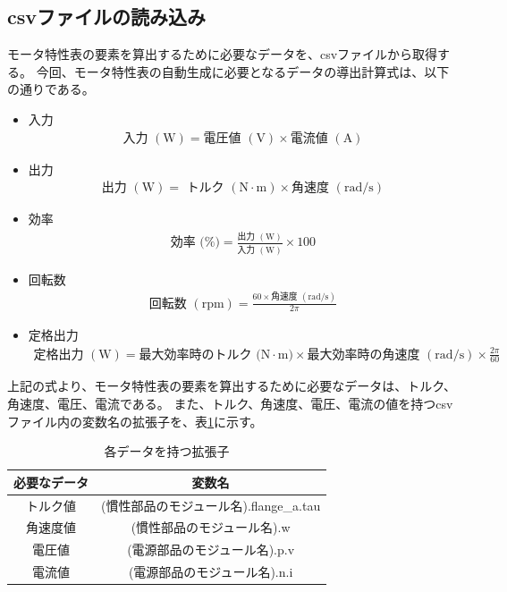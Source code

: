 \subsection{csvファイルの読み込み}\label{sub:csv_scan}
モータ特性表の要素を算出するために必要なデータを、csvファイルから取得する。
今回、モータ特性表の自動生成に必要となるデータの導出計算式は、以下の通りである。
\begin{itemize}

    \item 入力
    \begin{eqnarray}
        \mbox{入力 $(\mathrm{W})$} = \mbox{電圧値 $(\mathrm{V})$} \times \mbox{電流値 $(\mathrm{A})$} 　\label{siki:in}
    \end{eqnarray}
    \item 出力 
    \begin{eqnarray}
        \mbox{出力 $(\mathrm{W})$} = \mbox{ トルク $(\mathrm{N \cdot m})$} \times \mbox{角速度 $(\mathrm{rad/s})$} \label{siki:out}
    \end{eqnarray}
    \item 効率
    \begin{eqnarray}
        \mbox{効率 (\%)} = \frac{\mbox{出力 $(\mathrm{W})$}}{\mbox{入力 $(\mathrm{W})$}}  \times 100 \label{siki:effi}
    \end{eqnarray}
    \item 回転数
    \begin{eqnarray}
        \mbox{回転数 $(\mathrm{rpm})$} = \frac{60 \times \mbox{角速度 $(\mathrm{rad/s})$}}{2\pi}   \label{siki:speed}
    \end{eqnarray}
    \item 定格出力
    \begin{eqnarray}
        \mbox{定格出力 $(\mathrm{W})$} = \mbox{最大効率時のトルク $(\mathrm{N \cdot m)}$} \times \mbox{最大効率時の角速度  $(\mathrm{rad/s})$} \times \frac{2\pi}{60}　
        \label{siki:teikaku}
    \end{eqnarray}
     
\end{itemize}

上記の式より、モータ特性表の要素を算出するために必要なデータは、トルク、角速度、電圧、電流である。
また、トルク、角速度、電圧、電流の値を持つcsvファイル内の変数名の拡張子を、表\ref{tab:hensuu}に示す。　
\begin{table}[t]
	\centering
	\caption{各データを持つ拡張子}
	\begin{tabular}{|c|c|} \hline
	  必要なデータ & 変数名 \\ \hline \hline
	  トルク値 & (慣性部品のモジュール名).flange\_a.tau \\ \hline
	  角速度値 &  (慣性部品のモジュール名).w \\ \hline
	  電圧値 &  (電源部品のモジュール名).p.v \\ \hline
	  電流値 &  (電源部品のモジュール名).n.i \\ \hline
	\end{tabular}
	\label{tab:hensuu}
  \end{table}

